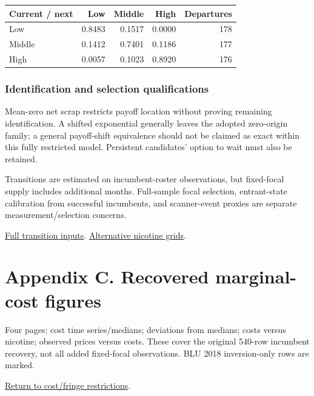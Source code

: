 \documentclass[11pt,]{article}
\begin{document}
\begin{longtable}[]{@{}lrrrr@{}}
\toprule
Current / next & Low & Middle & High & Departures\tabularnewline
\midrule
\endhead
Low & 0.8483 & 0.1517 & 0.0000 & 178\tabularnewline
Middle & 0.1412 & 0.7401 & 0.1186 & 177\tabularnewline
High & 0.0057 & 0.1023 & 0.8920 & 176\tabularnewline
\bottomrule
\end{longtable}

\subsubsection{Identification and selection
qualifications}\label{identification-and-selection-qualifications}

Mean-zero net scrap restricts payoff location without proving remaining
identification. A shifted exponential generally leaves the adopted
zero-origin family; a general payoff-shift equivalence should not be
claimed as exact within this fully restricted model. Persistent
candidates' option to wait must also be retained.

Transitions are estimated on incumbent-roster observations, but
fixed-focal supply includes additional months. Full-sample focal
selection, entrant-state calibration from successful incumbents, and
scanner-event proxies are separate measurement/selection concerns.

\href{../../output/dynamic_entry_exit/independent_transitions_2026-11-03/README.txt}{Full
transition inputs}.
\href{../../output/dynamic_entry_exit/nicotine_grid_comparison_2026-11-03/nicotine_grid_comparison.pdf}{Alternative
nicotine grids}.

\clearpage

\section{Appendix C. Recovered marginal-cost
figures}\label{appendix-c.-recovered-marginal-cost-figures}

Four pages: cost time series/medians; deviations from medians; costs
versus nicotine; observed prices versus costs. These cover the original
540-row incumbent recovery, not all added fixed-focal observations. BLU
2018 inversion-only rows are marked.

\protect\hyperlink{key-restrictions-costs-fringe-and-market-size}{Return
to cost/fringe restrictions}.


\end{document}
